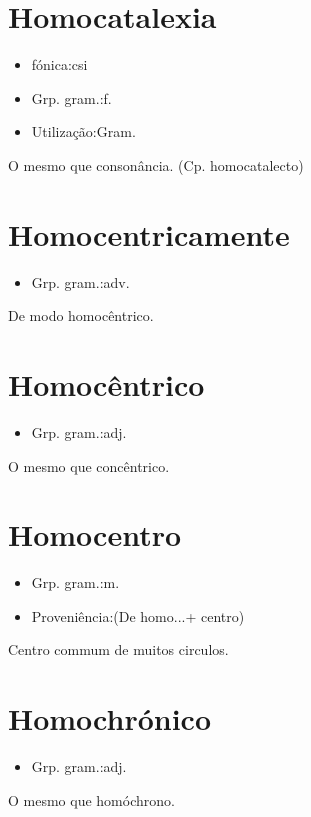 \documentclass{article}
\begin{document}
\section{Homocatalexia}
\begin{itemize}
\item {fónica:csi}
\end{itemize}
\begin{itemize}
\item {Grp. gram.:f.}
\end{itemize}
\begin{itemize}
\item {Utilização:Gram.}
\end{itemize}
O mesmo que \textunderscore consonância\textunderscore .
(Cp. \textunderscore homocatalecto\textunderscore )
\section{Homocentricamente}
\begin{itemize}
\item {Grp. gram.:adv.}
\end{itemize}
De modo homocêntrico.
\section{Homocêntrico}
\begin{itemize}
\item {Grp. gram.:adj.}
\end{itemize}
O mesmo que \textunderscore concêntrico\textunderscore .
\section{Homocentro}
\begin{itemize}
\item {Grp. gram.:m.}
\end{itemize}
\begin{itemize}
\item {Proveniência:(De \textunderscore homo...\textunderscore  + \textunderscore centro\textunderscore )}
\end{itemize}
Centro commum de muitos circulos.
\section{Homochrónico}
\begin{itemize}
\item {Grp. gram.:adj.}
\end{itemize}
O mesmo que \textunderscore homóchrono\textunderscore .
\end{document}
